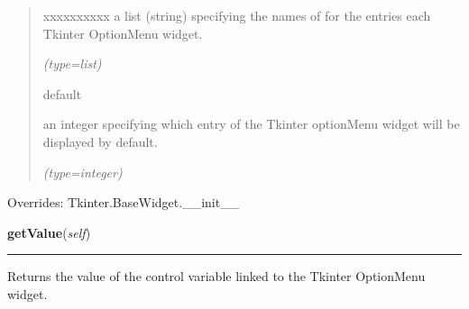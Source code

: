 \begin{boxedminipage}{\funcwidth}
\begin{quote}
\begin{Ventry}{xxxxxxxxxx}
          a list (string) specifying the names of for the entries each 
          Tkinter OptionMenu widget.

            {\it (type=list)}

          \item[default]

          an integer specifying which entry of the Tkinter optionMenu 
          widget will be displayed by default.

            {\it (type=integer)}

        \end{Ventry}

      \end{quote}

      Overrides: Tkinter.BaseWidget.\_\_init\_\_

    \end{boxedminipage}

    \label{nMOLDYN:GUI:Widgets:ComboOptionMenu:getValue}

    \vspace{0.5ex}

\hspace{.8\funcindent}\begin{boxedminipage}{\funcwidth}

    \raggedright \textbf{getValue}(\textit{self})

    \vspace{-1.5ex}

    \rule{\textwidth}{0.5\fboxrule}
\setlength{\parskip}{2ex}
    Returns the value of the control variable linked to the Tkinter 
    OptionMenu widget.

\setlength{\parskip}{1ex}
    \end{boxedminipage}

    \label{nMOLDYN:GUI:Widgets:ComboOptionMenu:setValue}

    \vspace{0.5ex}

